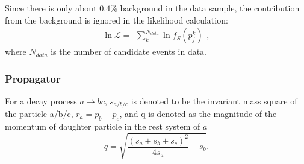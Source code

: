{    Since there is only about $0.4\%$ background in the data sample, the contribution from the background is ignored in the likelihood calculation:
    \begin{equation}
    \ln{\mathcal{L}} = \begin{matrix}\sum_{k}^{N_{data}} \ln f_{S}(p_{j}^{k})\end{matrix},  \label{likelihood}
    \end{equation}
    where $N_{data}$ is the number of candidate events in data.


    \subsubsection{Propagator}
    \label{propagator}
    \par{
        For a decay process $a \rightarrow bc$, $s_{a/b/c}$ is denoted to be the invariant mass square of the particle a/b/c, $r_{a}=p_{b}-p_{c}$, and q is denoted as the magnitude of the momentum of daughter particle in the rest system of $a$
        \begin{equation}
            q=\sqrt{ \frac{(s_{a} + s_{b} + s_{c})^{2}}{4s_{a}} - s_{b}}. \label{base-q}
        \end{equation}

}}
